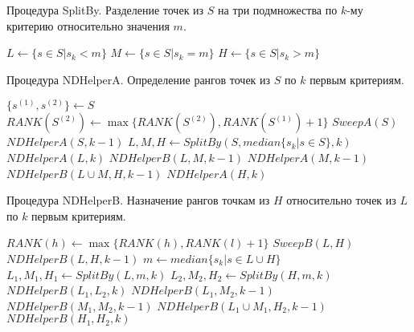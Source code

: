 \begin{algorithm}[!h]
\caption{Процедура SplitBy. Разделение точек из $S$ на три подмножества по $k$-му критерию относительно значения $m$.}\label{lst0}
\begin{algorithmic}
    \State $L \gets \{s \in S|s_k < m\}$
    \State $M \gets \{s \in S|s_k = m\}$
    \State $H \gets \{s \in S|s_k > m\}$
\EndProcedure
\end{algorithmic}
\end{algorithm}

\begin{algorithm}[!h]
\caption{Процедура NDHelperA. Определение рангов точек из $S$ по $k$ первым критериям.}\label{lst1}
\begin{algorithmic}
        \State \Return
        \State $\{s^{(1)}, s^{(2)}\}\gets S$
            \State $RANK(S^{(2)})\gets \max\{RANK(S^{(2)}), RANK(S^{(1)})+1\}$ 
        \EndIf
        \State$SweepA(S)$
        \State$NDHelperA(S, k-1)$
    \Else
        \State $L,M,H \gets SplitBy(S, median\{s_k|s \in S\}, k)$
        \State $NDHelperA(L, k)$
        \State $NDHelperB(L, M, k-1)$
        \State $NDHelperA(M, k-1)$
        \State $NDHelperB(L \cup M, H, k-1)$
        \State $NDHelperA(H, k)$
    \EndIf
\EndProcedure
\end{algorithmic}
\end{algorithm}

\begin{algorithm}[!h]
\caption{Процедура NDHelperB. Назначение рангов точкам из $H$ относительно точек из $L$ по $k$ первым критериям.}\label{lst2}
\begin{algorithmic}
        \State \Return
                \State $RANK(h) \gets \max\{RANK(h), RANK(l) + 1\}$
            \EndIf
        \EndFor
        \State $SweepB(L, H)$
        \State $NDHelperB(L, H, k-1)$
    \Else
        \State $m \gets median\{s_k|s \in L \cup H\}$
        \State $L_1, M_1, H_1 \gets SplitBy(L, m, k)$
        \State $L_2, M_2, H_2 \gets SplitBy(H, m, k)$
        \State $NDHelperB(L_1, L_2, k)$
        \State $NDHelperB(L_1, M_2, k-1)$
        \State $NDHelperB(M_1, M_2, k-1)$
        \State $NDHelperB(L_1 \cup M_1, H_2, k-1)$
        \State $NDHelperB(H_1, H_2, k)$
    \EndIf
\EndProcedure
\end{algorithmic}
\end{algorithm}
